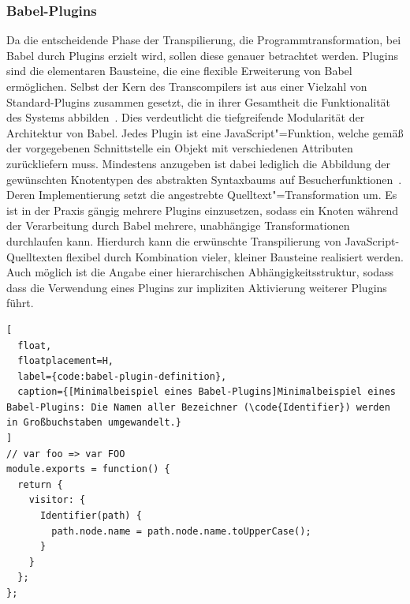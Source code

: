 \subsubsection{Babel-Plugins}
\label{subsec:babel-plugins}

Da die entscheidende Phase der Transpilierung, die Programmtransformation, bei Babel durch Plugins erzielt wird, sollen diese genauer betrachtet werden. Plugins sind die elementaren Bausteine, die eine flexible Erweiterung von Babel ermöglichen. Selbst der Kern des Transcompilers ist aus einer Vielzahl von Standard-Plugins zusammen gesetzt, die in ihrer Gesamtheit die Funktionalität des Systems abbilden~\autocite{BABEL}. Dies verdeutlicht die tiefgreifende Modularität der Architektur von Babel. Jedes Plugin ist eine JavaScript"=Funktion, welche gemäß der vorgegebenen Schnittstelle ein Objekt mit verschiedenen Attributen zurückliefern muss. Mindestens anzugeben ist dabei lediglich die Abbildung der gewünschten Knotentypen des abstrakten Syntaxbaums auf Besucherfunktionen~\autocite{BABEL:HANDBOOK}. Deren Implementierung setzt die angestrebte Quelltext"=Transformation um. Es ist in der Praxis gängig mehrere Plugins einzusetzen, sodass ein Knoten während der Verarbeitung durch Babel mehrere, unabhängige Transformationen durchlaufen kann. Hierdurch kann die erwünschte Transpilierung von JavaScript-Quelltexten flexibel durch Kombination vieler, kleiner Bausteine realisiert werden. Auch möglich ist die Angabe einer hierarchischen Abhängigkeitsstruktur, sodass dass die Verwendung eines Plugins zur impliziten Aktivierung weiterer Plugins führt.

\begin{lstlisting}[
  float,
  floatplacement=H,
  label={code:babel-plugin-definition},
  caption={[Minimalbeispiel eines Babel-Plugins]Minimalbeispiel eines Babel-Plugins: Die Namen aller Bezeichner (\code{Identifier}) werden in Großbuchstaben umgewandelt.}
]
// var foo => var FOO
module.exports = function() {
  return {
    visitor: {
      Identifier(path) {
        path.node.name = path.node.name.toUpperCase();
      }
    }
  };
};
\end{lstlisting}

